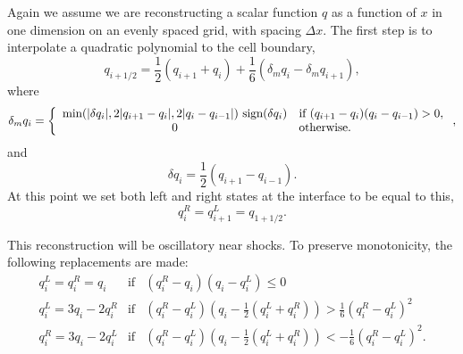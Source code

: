\documentclass{article}
\begin{document}
Again we assume we are reconstructing a scalar function $q$ as a
function of $x$ in one dimension on an evenly spaced grid, with spacing $\Delta
x$. The first step is to interpolate a quadratic polynomial to the cell
boundary, 
\begin{equation}
  \label{eq:ppm1}
  q_{i+1/2} = \frac{1}{2} \left( q_{i+1} + q_i \right) + \frac{1}{6}
  \left( \delta_m q_i - \delta_m q_{i+1} \right), 
\end{equation}
where
\begin{equation}
  \label{eq:ppmdm1}
  \delta_m q_i = \left\{ \begin{array}{c l} \text{min}(|\delta q_i|,
      2|q_{i+1} - q_i|, 2|q_i - q_{i-1}|) \text{ sign}(\delta q_i) &
      \text{if } (q_{i+1} - q_i)(q_i - q_{i-1}) > 0, \\
      0 & \text{otherwise}. \end{array} \right.,
\end{equation}
and
\begin{equation}
  \label{eq:ppmd1}
  \delta q_i = \frac{1}{2}(q_{i+1} - q_{i-1}).
\end{equation}
At this point we set both left and right states at the interface to be
equal to this,
\begin{equation}
  \label{eq:ppmset1}
  q_i^R = q_{i+1}^L = q_{1+1/2}.
\end{equation}

This reconstruction will be oscillatory near shocks. To preserve
monotonicity, the following replacements are made:
\begin{eqnarray}
  \label{eq:ppmmonot}
  q_i^L = q_i^R = q_i & \text{if} & (q_i^R - q_i)(q_i - q_i^L) \leq
  0 \\
  q_i^L = 3 q_i - 2q_i^R & \text{if} & (q_i^R - q_i^L)\left( q_i -
  \frac{1}{2} (q_i^L + q_i^R) \right) > \frac{1}{6}(q_i^R - q_i^L)^2
  \\ 
  q_i^R = 3 q_i - 2q_i^L & \text{if} & (q_i^R - q_i^L)\left( q_i -
  \frac{1}{2} (q_i^L + q_i^R) \right) < -\frac{1}{6}(q_i^R -
  q_i^L)^2. 
\end{eqnarray}
\end{document}
